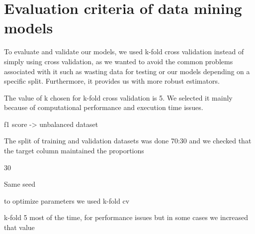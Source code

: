 
\section{Evaluation criteria of data mining models}%
\label{sec:eval-criteria}


To evaluate and validate our models, we used k-fold cross validation instead of
simply using cross validation, as we wanted to avoid the common problems associated
with it such as wasting data for testing or our models depending on a specific split.
Furthermore, it provides us with more robust estimators.

The value of k chosen for k-fold cross validation is 5. We selected it mainly
because of computational performance and execution time issues.


f1 score -> unbalanced dataset

The split of training and validation datasets was done 70:30 and we checked that the
target column maintained the proportions 

30%

Same seed

to optimize parameters we used k-fold cv

k-fold 5 most of the time, for performance issues but in some cases we increased that value